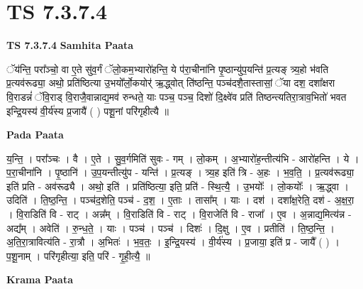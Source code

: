 \documentclass[17pt]{extarticle}
\begin{document}
\section{ TS 7.3.7.4 }

\textbf{TS 7.3.7.4 } \newline
\textbf{Samhita Paata} \newline

ॅय॑न्ति॒ परा᳚ञ्चो॒ वा ए॒ते सु॑व॒र्गं ॅलो॒कम॒भ्यारो॑हन्ति॒ ये प॑रा॒चीना॑नि पृ॒ष्ठान्यु॑प॒यन्ति॑ प्र॒त्यङ् त्र्य॒हो भ॑वति प्र॒त्यव॑रूढ्या॒ अथो॒ प्रति॑ष्ठित्या उ॒भयो᳚र्लो॒कयोर्॑ ऋ॒द्ध्वोत् ति॑ष्ठन्ति॒ पञ्च॑दशै॒तास्तासां॒ ॅया दश॒ दशा᳚क्षरा वि॒राडन्नं॑ ॅवि॒राड् वि॒राजै॒वान्नाद्य॒मव॑ रुन्धते॒ याः पञ्च॒ पञ्च॒ दिशो॑ दि॒क्ष्वे॑व प्रति॑ तिष्ठन्त्यतिरा॒त्राव॒भितो॑ भवत इन्द्रि॒यस्य॑ वी॒र्य॑स्य प्र॒जायै॑ ( ) पशू॒नां परि॑गृहीत्यै ॥ \newline

\textbf{Pada Paata} \newline

य॒न्ति॒ । परा᳚ञ्चः । वै । ए॒ते । सु॒व॒र्गमिति॑ सुवः - गम् । लो॒कम् । अ॒भ्यारो॑ह॒न्तीत्य॑भि - आरो॑हन्ति । ये । प॒रा॒चीना॑नि । पृ॒ष्ठानि॑ । उ॒प॒यन्तीत्यु॑प - यन्ति॑ । प्र॒त्यङ् । त्र्य॒ह इति॑ त्रि - अ॒हः । भ॒व॒ति॒ । प्र॒त्यव॑रूढ्या॒ इति॑ प्रति - अव॑रूढ्यै । अथो॒ इति॑ । प्रति॑ष्ठित्या॒ इति॒ प्रति॑ - स्थि॒त्यै॒ । उ॒भयोः᳚ । लो॒कयोः᳚ । ऋ॒द्ध्वा । उदिति॑ । ति॒ष्ठ॒न्ति॒ । पञ्च॑द॒शेति॒ पञ्च॑ - द॒श॒ । ए॒ताः । तासा᳚म् । याः । दश॑ । दशा᳚क्ष॒रेति॒ दश॑ - अ॒क्ष॒रा॒ । वि॒राडिति॑ वि - राट् । अन्न᳚म् । वि॒राडिति॑ वि - राट् । वि॒राजेति॑ वि - राजा᳚ । ए॒व । अ॒न्नाद्य॒मित्य॑न्न - अद्य᳚म् । अवेति॑ । रु॒न्ध॒ते॒ । याः । पञ्च॑ । पञ्च॑ । दिशः॑ । दि॒क्षु । ए॒व । प्रतीति॑ । ति॒ष्ठ॒न्ति॒ । अ॒ति॒रा॒त्रावित्य॑ति - रा॒त्रौ । अ॒भितः॑ । भ॒व॒तः॒ । इ॒न्द्रि॒यस्य॑ । वी॒र्य॑स्य । प्र॒जाया॒ इति॑ प्र - जायै᳚ ( ) । प॒शू॒नाम् । परि॑गृहीत्या॒ इति॒ परि॑ - गृ॒ही॒त्यै॒ ॥  \newline


\textbf{Krama Paata} \newline
\end{document}

